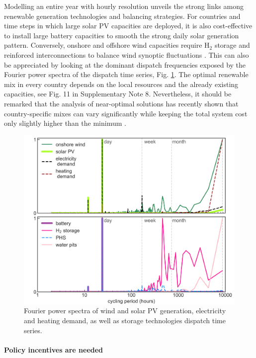 \documentclass[5p]{elsarticle} %
\begin{document}
Modelling an entire year with hourly resolution unveils the strong links among renewable generation technologies and balancing strategies. For countries and time steps in which large solar PV capacities are deployed, it is also cost-effective to install large battery capacities to smooth the strong daily solar generation pattern. Conversely, onshore and offshore wind capacities require H$_2$ storage and reinforced interconnections to balance wind synoptic fluctuations \cite{Rasmussen_2012, Rodriguez_2014, Schlachtberger_2017, Victoria_2019_storage}. This can also be appreciated by looking at the dominant dispatch frequencies exposed by the Fourier power spectra of the dispatch time series, Fig. \ref{fig_Fourier}. The optimal renewable mix in every country depends on the local resources and the already existing capacities, see Fig. 11 in Supplementary Note 8. Nevertheless, it should be remarked that the analysis of near-optimal solutions has recently shown that country-specific mixes can vary significantly while keeping the total system cost only slightly higher than the minimum \cite{Neumann_2019}. 

\begin{figure}[!h]
\centering
\includegraphics[width=\columnwidth]{figures/Fourier.png}
\caption{Fourier power spectra of wind and solar PV generation, electricity and heating demand, as well as storage technologies dispatch time series.} \label{fig_Fourier} 
\end{figure}

\FloatBarrier
 
\paragraph{\textbf{Policy incentives are needed}} \
\end{document}

